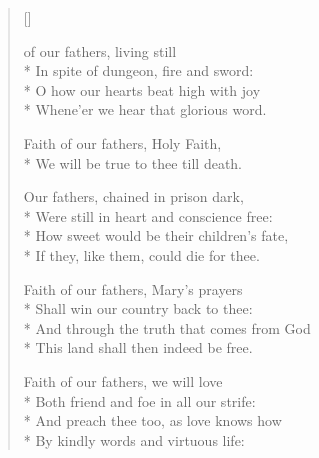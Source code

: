\newHymn


\begin{verse}[\versewidth]

\begin{altverse}
 of our fathers, living still\\*
In spite of dungeon, fire and sword:\\*
O how our hearts beat high with joy\\*
Whene'er we hear that glorious word.
\end{altverse}

Faith of our fathers, Holy Faith,\\*
We will be true to thee till death.

\begin{altverse}
Our fathers, chained in prison dark,\\*
Were still in heart and conscience free:\\*
How sweet would be their children's fate,\\*
If they, like them, could die for thee.
\end{altverse}
						
\begin{altverse}
Faith of our fathers, Mary's prayers\\*
Shall win our country back to thee:\\*
    And through the truth that comes from God\\*
        This land shall then indeed be free.
\end{altverse}

\begin{altverse}
Faith of our fathers, we will love\\*
        Both friend and foe in all our strife:\\*
    And preach thee too, as love knows how\\*
        By kindly words and virtuous life:
\end{altverse}

\end{verse}

